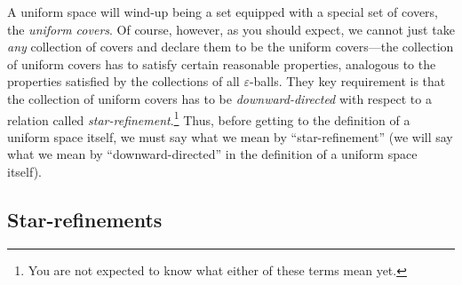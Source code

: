 A uniform space will wind-up being a set equipped with a special set of covers, the \emph{uniform covers}.  Of course, however, as you should expect, we cannot just take \emph{any} collection of covers and declare them to be the uniform covers---the collection of uniform covers has to satisfy certain reasonable properties, analogous to the properties satisfied by the collections of all $\varepsilon$-balls.  They key requirement is that the collection of uniform covers has to be \emph{downward-directed} with respect to a relation called \emph{star-refinement}.\footnote{You are not expected to know what either of these terms mean yet.}  Thus, before getting to the definition of a uniform space itself, we must say what we mean by ``star-refinement'' (we will say what we mean by ``downward-directed'' in the definition of a uniform space itself).

\subsection{Star-refinements}

